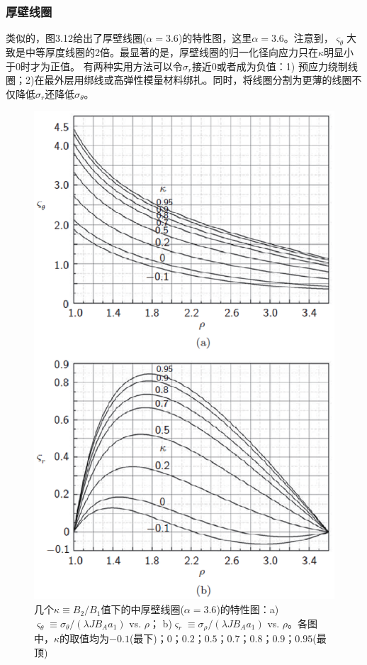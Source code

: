 \subsubsection{厚壁线圈}
类似的，图3.12给出了厚壁线圈($\alpha=3.6$)的特性图，这里$\alpha=3.6$。注意到，$\varsigma_\theta$大致是中等厚度线圈的2倍。最显著的是，厚壁线圈的归一化径向应力只在$\kappa$明显小于0时才为正值。
有两种实用方法可以令$\sigma_{r}$接近0或者成为负值：1) 预应力绕制线圈；2)在最外层用绑线或高弹性模量材料绑扎。同时，将线圈分割为更薄的线圈不仅降低$\sigma_{r}$还降低$\sigma_{\theta}$。
\begin{figure}
  \centering
 \includegraphics[scale=0.8]{chpt3/figs/fig3.12.eps}
  \caption{几个$\kappa\equiv B_2/B_1$值下的中厚壁线圈($\alpha=3.6$)的特性图：a)$\varsigma_\theta\equiv \sigma_\theta/(\lambda J B_A a_1)$ vs. $\rho$；
  b)$\varsigma_r \equiv \sigma_\rho/(\lambda J B_A a_1)$ vs. $\rho$。各图中，$\kappa$的取值均为$-0.1$(最下)；$0$；$0.2$；$0.5$；$0.7$；$0.8$；$0.9$；$0.95$(最顶) }
\end{figure}


